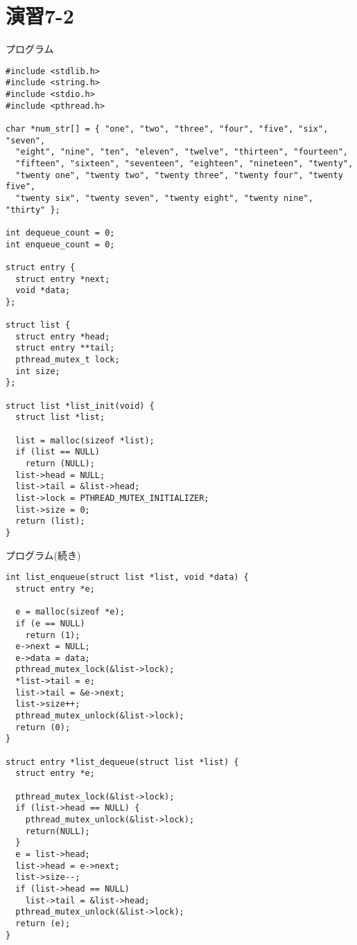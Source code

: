 \documentclass[10pt]{jarticle}
\begin{document}
\newpage

\section{演習7-2}
\begin{itembox}[l]{プログラム}
  \begin{verbatim}
#include <stdlib.h>
#include <string.h>
#include <stdio.h>
#include <pthread.h>

char *num_str[] = { "one", "two", "three", "four", "five", "six", "seven",
  "eight", "nine", "ten", "eleven", "twelve", "thirteen", "fourteen",
  "fifteen", "sixteen", "seventeen", "eighteen", "nineteen", "twenty",
  "twenty one", "twenty two", "twenty three", "twenty four", "twenty five",
  "twenty six", "twenty seven", "twenty eight", "twenty nine", "thirty" };

int dequeue_count = 0;
int enqueue_count = 0;

struct entry {
  struct entry *next;
  void *data;
};

struct list {
  struct entry *head;
  struct entry **tail;
  pthread_mutex_t lock;
  int size;
};

struct list *list_init(void) {
  struct list *list;

  list = malloc(sizeof *list);
  if (list == NULL)
    return (NULL);
  list->head = NULL;
  list->tail = &list->head;
  list->lock = PTHREAD_MUTEX_INITIALIZER;
  list->size = 0;
  return (list);
}
  \end{verbatim}
\end{itembox}

\begin{itembox}[l]{プログラム(続き)}
  \begin{verbatim}
int list_enqueue(struct list *list, void *data) {
  struct entry *e;

  e = malloc(sizeof *e);
  if (e == NULL)
    return (1);
  e->next = NULL;
  e->data = data;
  pthread_mutex_lock(&list->lock);
  *list->tail = e;
  list->tail = &e->next;
  list->size++;
  pthread_mutex_unlock(&list->lock);
  return (0);
}

struct entry *list_dequeue(struct list *list) {
  struct entry *e;

  pthread_mutex_lock(&list->lock);
  if (list->head == NULL) {
    pthread_mutex_unlock(&list->lock);
    return(NULL);
  }
  e = list->head;
  list->head = e->next;
  list->size--;
  if (list->head == NULL)
    list->tail = &list->head;
  pthread_mutex_unlock(&list->lock);
  return (e);
}
  \end{verbatim}
\end{itembox}
\end{document}
